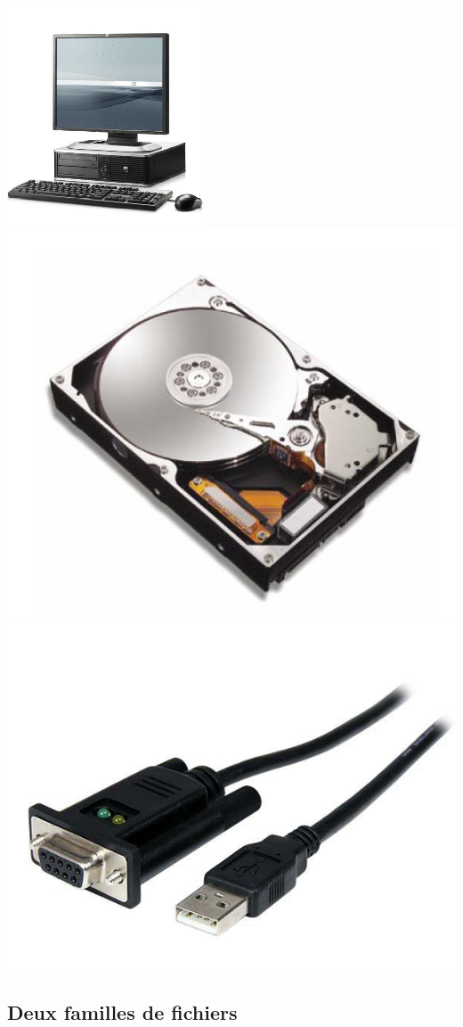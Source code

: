 \documentclass[10pt,fleqn]{article} %
\begin{document}
\begin{center}
\includegraphics[width=.3\textwidth]{images/image1.png}
\includegraphics[width=.3\textwidth]{images/image2.png}
\includegraphics[width=.3\textwidth]{images/image3.png}
\end{center}


\subsection{Deux familles de fichiers}
\end{document}

